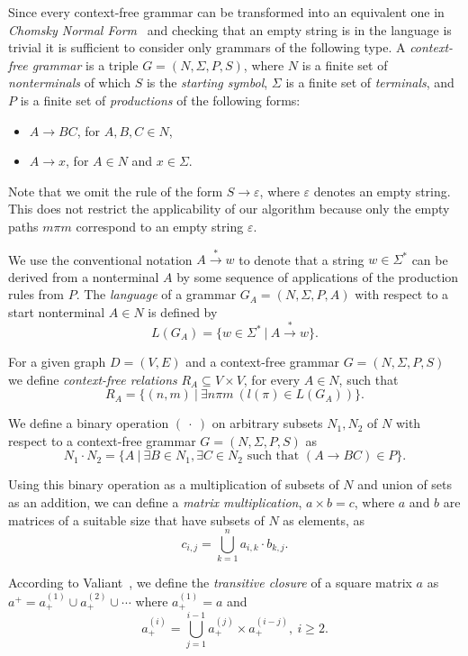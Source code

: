 \documentclass[runningheads,a4paper]{llncs}
\begin{document}
Since every context-free grammar can be transformed into an equivalent one in \textit{Chomsky Normal Form}~\cite{chomsky} and checking that an empty string is in the language is trivial it is sufficient to consider only grammars of the following type. A \textit{context-free grammar} is a triple $G = (N, \Sigma, P, S)$, where $N$ is a finite set of \textit{nonterminals} of which $S$ is the \textit{starting symbol}, $\Sigma$ is a finite set of \textit{terminals}, and $P$ is a finite set of \textit{productions} of the following forms:

\begin{itemize}
	\item $A \rightarrow B C$, for $A,B,C \in N$,
	\item $A \rightarrow x$, for $A \in N$ and $x \in \Sigma$.   
\end{itemize}

Note that we omit the rule of the form $S \rightarrow \varepsilon$, where $\varepsilon$ denotes an empty string. This does not restrict the applicability of our algorithm because only the empty paths $m \pi m$ correspond to an empty string $\varepsilon$.

We use the conventional notation $A \xrightarrow{*} w$ to denote that a string $w \in \Sigma^*$ can be derived from a nonterminal $A$ by some sequence of applications of the production rules from $P$. The \textit{language} of a grammar $G_A = (N,\Sigma,P,A)$ with respect to a start nonterminal $A \in N$ is defined by $$L(G_A) = \{w \in \Sigma^*~|~A \xrightarrow{*} w\}.$$

For a given graph $D = (V, E)$ and a context-free grammar $G = (N, \Sigma, P, S)$ we define \textit{context-free relations} $R_A \subseteq V \times V$, for every $A \in N$, such that $$R_A = \{(n,m)~|~\exists n \pi m~(l(\pi) \in L(G_A))\}.$$

We define a binary operation $(~\cdot~)$ on arbitrary subsets $N_1 , N_2$ of $N$ with respect to a context-free grammar $G = (N, \Sigma, P,S)$ as $$N_1 \cdot N_2 = \{A~|~\exists B \in N_1, \exists C \in N_2 \text{ such that }(A \rightarrow B C) \in P\}.$$

Using this binary operation as a multiplication of subsets of $N$ and union of sets as an addition, we can define a \textit{matrix multiplication}, $a \times b = c$, where $a$ and $b$ are matrices of a suitable size that have subsets of $N$ as elements, as $$c_{i,j} = \bigcup^{n}_{k=1}{a_{i,k} \cdot b_{k,j}}.$$

According to Valiant~\cite{valiant}, we define the \textit{transitive closure} of a square matrix $a$ as $a^+ = a^{(1)}_+ \cup a^{(2)}_+ \cup \cdots$ where $a^{(1)}_+ = a$ and $$a^{(i)}_+ = \bigcup^{i-1}_{j=1}{a^{(j)}_+ \times a^{(i-j)}_+}, ~i \ge 2.$$
\end{document}
